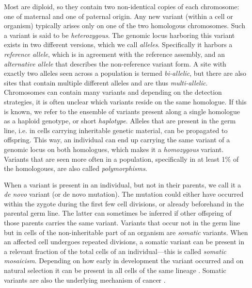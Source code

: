 Most  are diploid, so they contain two non-identical
copies of each chromosome: one of maternal and one of paternal origin. Any new
variant (within a cell or organism) typically arises only on one of the two
homologous chromosomes. Such a variant is said to be \emph{heterozygous}. The
genomic locus harboring this variant exists in two different versions, which we
call \emph{alleles}. Specifically it harbors a \emph{reference allele}, which is
in agreement with the reference assembly, and
an \emph{alternative allele} that describes the non-reference variant form. A
site with exactly two alleles seen across a population is termed
\emph{bi-allelic}, but there are also sites that contain multiple different
alleles and are thus \emph{multi-allelic}. Chromosomes can contain many variants
and depending on the detection strategies, it is often unclear which variants
reside on the same homologue. If this is known, we refer to the ensemble of
variants present along a single homologue as a haploid genotype, or short
\emph{haplotype}. Alleles that are present in the germ line, i.e. in cells
carrying inheritable genetic material, can be propagated to offspring. This way,
an individual can end up carrying the same variant of a genomic locus on both
homologues, which makes it a \emph{homozygous} variant. Variants that are seen
more often in a population, specifically in at least 1\% of the homologoues,
are also called \emph{polymorphisms}.

When a variant is present in an individual, but not in their parents, we call it
a \emph{de novo} variant (or de novo mutation). The mutation could
either have occurred within the
zygote during the first few cell divisions, or already beforehand in the
parental germ line. The latter can sometimes be inferred if other offspring of
those parents carries the same variant. Variants that occur not in the germ line
but in cells of the non-inheritable part of an organism are \emph{somatic}
variants. When an affected cell undergoes repeated divisions, a somatic variant
can be present in a relevant fraction of the total cells of an individual---this
is called \emph{somatic mosaicism}. Depending on how early in development the
variant occurred and on natural selection it can be present in all cells of the
same lineage \citep{Youssoufian2002}. Somatic variants are also the underlying
mechanism of cancer \citep{Campbell2007}.


